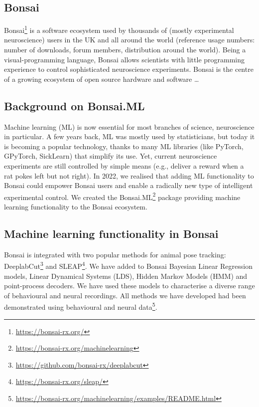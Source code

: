 \subsection*{Bonsai}

Bonsai\footnote[1]{\url{https://bonsai-rx.org/}} is a software ecosystem used by thousands
of (mostly experimental neuroscience) users in the UK and all around the world
(reference usage numbers: number of downloads, forum members, distribution
around the world).
%
Being a visual-programming language, Bonsai allows scientists with little
programming experience to control sophisticated neuroscience experiments.
%
Bonsai is the centre of a growing ecosystem of open source hardware and
software \ldots


\subsection*{Background on Bonsai.ML}

Machine learning (ML) is now essential for most branches of science,
neuroscience in particular.
%
A few years back, ML was mostly used by statisticians, but today it is becoming
a popular technology, thanks to many ML libraries (like PyTorch, GPyTorch,
SickLearn) that simplify its use.
%
Yet, current neuroscience experiments are still controlled by simple means
(e.g., deliver a reward when a rat pokes left but not right).
%
In 2022, we realised that adding ML functionality to Bonsai could empower
Bonsai users and enable a radically new type of intelligent experimental
control.
%
%
We created the
Bonsai.ML\footnote[2]{\url{https://bonsai-rx.org/machinelearning}}
package providing machine learning functionality to the Bonsai ecosystem.

\subsection*{Machine learning functionality in Bonsai}

Bonsai is integrated with two popular methods for animal pose tracking:
DeeplabCut\footnote[3]{\url{https://github.com/bonsai-rx/deeplabcut}} and
SLEAP\footnote[4]{\url{https://bonsai-rx.org/sleap/}}.
%
We have added to Bonsai Bayesian Linear Regression models, Linear Dynamical
Systems (LDS), Hidden Markov Models (HMM) and point-process decoders.
%
We have used these models to characterise a diverse range of behavioural and
neural recordings.
%
All methods we have developed had been demonstrated using behavioural and
neural
data\footnote[5]{\url{https://bonsai-rx.org/machinelearning/examples/README.html}}.

